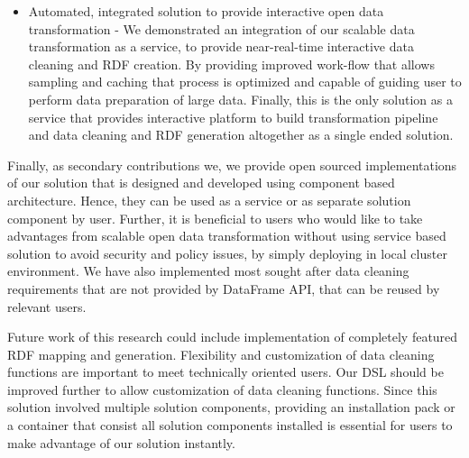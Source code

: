 \begin{itemize}
\item Automated, integrated solution to provide interactive open data transformation - We demonstrated an integration of our scalable data transformation as a service, to provide near-real-time interactive data cleaning and RDF creation. By providing improved work-flow that allows sampling and caching that process is optimized and capable of guiding user to perform data preparation of large data. Finally, this is the only solution as a service that provides interactive platform to build transformation pipeline and data cleaning and RDF generation altogether as a single ended solution. 
\end{itemize}
Finally, as secondary contributions we, we provide open sourced implementations of our solution that is designed and developed using component based architecture. Hence, they can be used as a service or as separate solution component by user. Further, it is beneficial to users who would like to take advantages from scalable open data transformation without using service based solution to avoid security and policy issues, by simply deploying in local cluster environment. We have also implemented most sought after data cleaning requirements that are not provided by DataFrame API, that can be reused by relevant users. 

Future work of this research could include implementation of completely featured RDF mapping and generation. Flexibility and customization of data cleaning functions are important to meet technically oriented users. Our DSL should be improved further to allow customization of data cleaning functions. Since this solution involved multiple solution components, providing an installation pack or a container that consist all solution components installed is essential for users to make advantage of our solution instantly.  


